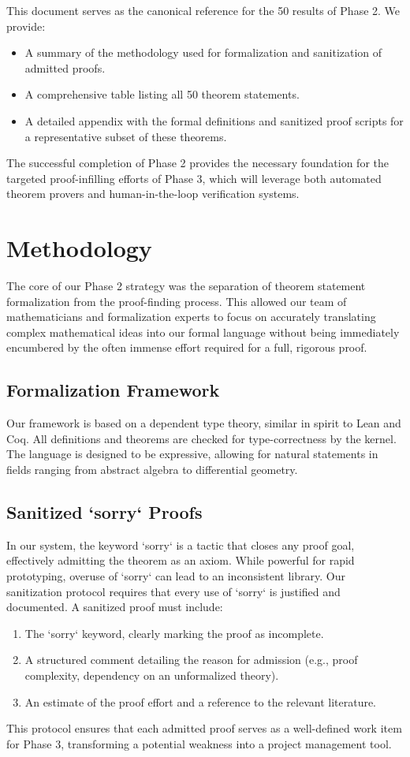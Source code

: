 \documentclass[11pt, a4paper]{article}
\theoremstyle{plain}
\theoremstyle{definition}
\theoremstyle{remark}
\begin{document}
This document serves as the canonical reference for the 50 results of Phase 2. We provide:
\begin{itemize}
    \item A summary of the methodology used for formalization and sanitization of admitted proofs.
    \item A comprehensive table listing all 50 theorem statements.
    \item A detailed appendix with the formal definitions and sanitized proof scripts for a representative subset of these theorems.
\end{itemize}
The successful completion of Phase 2 provides the necessary foundation for the targeted proof-infilling efforts of Phase 3, which will leverage both automated theorem provers and human-in-the-loop verification systems.

\section{Methodology}

The core of our Phase 2 strategy was the separation of theorem statement formalization from the proof-finding process. This allowed our team of mathematicians and formalization experts to focus on accurately translating complex mathematical ideas into our formal language without being immediately encumbered by the often immense effort required for a full, rigorous proof.

\subsection{Formalization Framework}
Our framework is based on a dependent type theory, similar in spirit to Lean and Coq. All definitions and theorems are checked for type-correctness by the kernel. The language is designed to be expressive, allowing for natural statements in fields ranging from abstract algebra to differential geometry.

\subsection{Sanitized `sorry` Proofs}
In our system, the keyword `sorry` is a tactic that closes any proof goal, effectively admitting the theorem as an axiom. While powerful for rapid prototyping, overuse of `sorry` can lead to an inconsistent library. Our sanitization protocol requires that every use of `sorry` is justified and documented. A sanitized proof must include:
\begin{enumerate}
    \item The `sorry` keyword, clearly marking the proof as incomplete.
    \item A structured comment detailing the reason for admission (e.g., proof complexity, dependency on an unformalized theory).
    \item An estimate of the proof effort and a reference to the relevant literature.
\end{enumerate}
This protocol ensures that each admitted proof serves as a well-defined work item for Phase 3, transforming a potential weakness into a project management tool.
\end{document}
